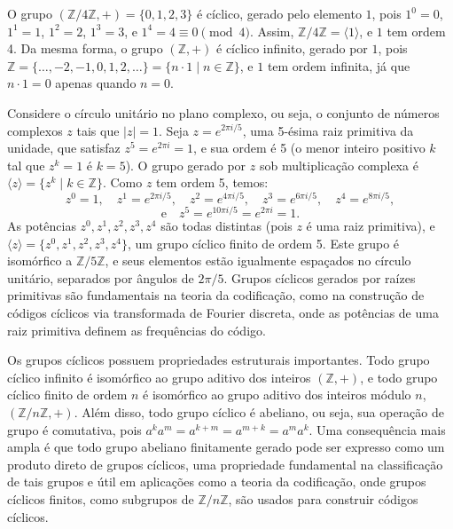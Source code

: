 \begin{example}
  O grupo $(\mathbb{Z}/4\mathbb{Z}, +) = \{0, 1, 2, 3\}$ é cíclico, gerado pelo
  elemento $1$, pois $1^0 = 0$, $1^1 = 1$, $1^2 = 2$, $1^3 = 3$, e $1^4 = 4 \equiv 0 \pmod{4}$.
  Assim, $\mathbb{Z}/4\mathbb{Z} = \langle 1 \rangle$, e
  $1$ tem ordem 4. Da mesma forma, o grupo $(\mathbb{Z}, +)$ é cíclico
  infinito, gerado por $1$, pois 
  $\mathbb{Z} = \{ \ldots, -2, -1, 0, 1, 2, \ldots \} = \{ n \cdot 1 \mid n \in \mathbb{Z} \}$, 
  e $1$ tem ordem infinita, já que $n \cdot 1 = 0$ apenas quando $n = 0$.
\end{example}

\begin{example}
  Considere o círculo unitário no plano complexo, ou seja, o conjunto de
  números complexos $z$ tais que $|z| = 1$. Seja $z = e^{2\pi i / 5}$, uma
  5-ésima raiz primitiva da unidade, que satisfaz $z^5 = e^{2\pi i} = 1$, e sua
  ordem é 5 (o menor inteiro positivo $k$ tal que $z^k = 1$ é $k = 5$). O grupo
  gerado por $z$ sob multiplicação complexa é
  $\langle z \rangle = \{ z^k \mid k \in \mathbb{Z} \}$.
  Como $z$ tem ordem 5, temos:
  \[
    z^0 = 1, \quad z^1 = e^{2\pi i / 5}, \quad z^2 = e^{4\pi i / 5}, \quad z^3 = e^{6\pi i / 5}, \quad z^4 = e^{8\pi i / 5}, 
  \]
  \[
    \text{e}\quad z^5 = e^{10\pi i / 5} = e^{2\pi i} = 1 .
  \]
  As potências $z^0, z^1, z^2, z^3,
  z^4$ são todas distintas (pois $z$ é uma raiz primitiva), e
  $\langle z \rangle = \{ z^0, z^1, z^2, z^3, z^4 \}$, 
  um grupo cíclico finito de ordem 5.
  Este grupo é isomórfico a $\mathbb{Z}/5\mathbb{Z}$, e seus elementos estão
  igualmente espaçados no círculo unitário, separados por ângulos de $2\pi/5$.
  Grupos cíclicos gerados por raízes primitivas são fundamentais na teoria
  da codificação, como na construção de códigos cíclicos via transformada de
  Fourier discreta, onde as potências de uma raiz primitiva definem as
  frequências do código.
\end{example}

\begin{remark}
  Os grupos cíclicos possuem propriedades estruturais importantes. Todo grupo
  cíclico infinito é isomórfico ao grupo aditivo dos inteiros $(\mathbb{Z}, +)$,
  e todo grupo cíclico finito de ordem $n$ é isomórfico ao grupo aditivo
  dos inteiros módulo $n$, $(\mathbb{Z}/n\mathbb{Z}, +)$. Além disso, todo
  grupo cíclico é abeliano, ou seja, sua operação de grupo é comutativa, pois
  $a^k a^m = a^{k+m} = a^{m+k} = a^m a^k$. Uma consequência mais ampla é que
  todo grupo abeliano finitamente gerado pode ser expresso como um produto
  direto de grupos cíclicos, uma propriedade fundamental na classificação de
  tais grupos e útil em aplicações como a teoria da codificação, onde grupos
  cíclicos finitos, como subgrupos de $\mathbb{Z}/n\mathbb{Z}$, são usados para
  construir códigos cíclicos.
\end{remark}
















